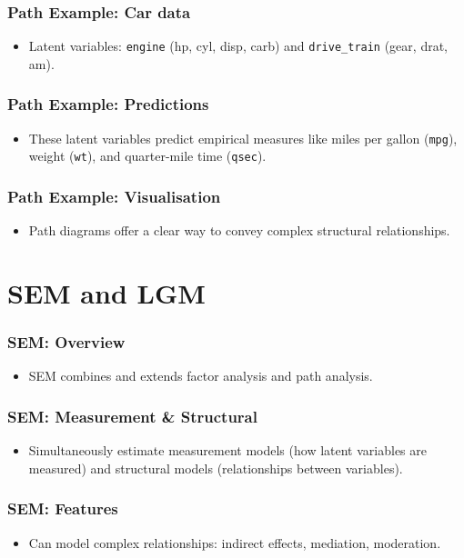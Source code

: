 \documentclass{beamer}
\begin{document}
\begin{frame}
    \frametitle{Path Example: Car data}
    \begin{itemize}
        \item Latent variables: \texttt{engine} (hp, cyl, disp, carb) and \texttt{drive\_train} (gear, drat, am).
    \end{itemize}
\end{frame}

\begin{frame}
    \frametitle{Path Example: Predictions}
    \begin{itemize}
        \item These latent variables predict empirical measures like miles per gallon (\texttt{mpg}), weight (\texttt{wt}), and quarter-mile time (\texttt{qsec}).
    \end{itemize}
\end{frame}

\begin{frame}
    \frametitle{Path Example: Visualisation}
    \begin{itemize}
        \item Path diagrams offer a clear way to convey complex structural relationships.
    \end{itemize}
\end{frame}

\section{SEM and LGM}

\begin{frame}
    \frametitle{SEM: Overview}
    \begin{itemize}
        \item SEM combines and extends factor analysis and path analysis.
    \end{itemize}
\end{frame}

\begin{frame}
    \frametitle{SEM: Measurement \& Structural}
    \begin{itemize}
        \item Simultaneously estimate measurement models (how latent variables are measured) and structural models (relationships between variables).
    \end{itemize}
\end{frame}

\begin{frame}
    \frametitle{SEM: Features}
    \begin{itemize}
        \item Can model complex relationships: indirect effects, mediation, moderation.
    \end{itemize}
\end{frame}
\end{document}

